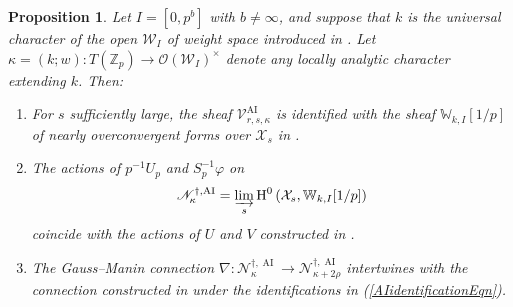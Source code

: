 \documentclass[10pt, oneside]{amsart}
\numberwithin{equation}{subsection}
\newtheorem{proposition}[equation]{Proposition}
\theoremstyle{definition}
\theoremstyle{remark}
\newcommand{\mbb}[1]{\mathbb{#1}}
\newcommand{\opn}[1]{\operatorname{#1}}
\begin{document}
\begin{proposition} \label{PropComparisonWithAI}
    Let $I = [0, p^{b}]$ with $b \neq \infty$, and suppose that $k$ is the universal character of the open $\mathcal{W}_I$ of weight space introduced in \cite[p.2004]{AI_LLL}. Let $\kappa = (k; w) \colon T(\mbb{Z}_p) \to \mathcal{O}(\mathcal{W}_I)^{\times}$ denote any locally analytic character extending $k$. Then:
    \begin{enumerate}
        \item For $s$ sufficiently large, the sheaf $\mathcal{V}_{r, s, \kappa}^{\opn{AI}}$ is identified with the sheaf $\mbb{W}_{k, I}[1/p]$ of nearly overconvergent forms over $\mathcal{X}_s$ in \cite[\S 3.3]{AI_LLL}.
        \item The actions of $p^{-1}U_p$ and $S_p^{-1} \varphi$ on 
    \begin{equation} \label{AIidentificationEqn}
    \mathscr{N}^{\dagger, \opn{AI}}_{\kappa} = \varinjlim_s \opn{H}^0\left( \mathcal{X}_s, \mbb{W}_{k, I}[1/p] \right)
    \end{equation}
    coincide with the actions of $U$ and $V$ constructed in \cite[\S 3.6--\S 3.7]{AI_LLL}.
    \item The Gauss--Manin connection $\nabla \colon \mathscr{N}^{\dagger, \opn{AI}}_{\kappa} \to \mathscr{N}^{\dagger, \opn{AI}}_{\kappa + 2\rho}$ intertwines with the connection constructed in \cite[\S 3.4]{AI_LLL} under the identifications in (\ref{AIidentificationEqn}).
    \end{enumerate}
\end{proposition}
\end{document}
